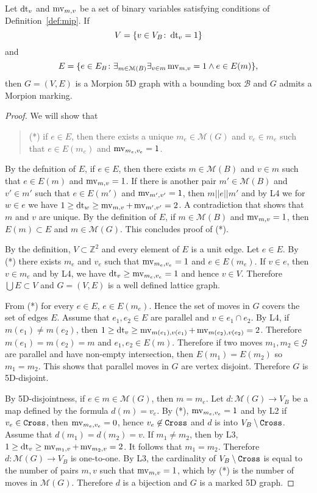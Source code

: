 \begin{lemma}
  Let $\operatorname{dt}_v$ and $\operatorname{mv}_{m, v}$ be a set of binary variables satisfying 
    conditions of Definition~\ref{def:mip}.
  If
 \[
    V = \{ v \in V_B \colon \operatorname{dt}_v = 1 \}
\]
 and
 \[
    E = \{ e \in E_B \colon \exists_{m \in \mathcal{M}(B)} \exists_{v \in m} \operatorname{mv}_{m, v} = 1 \wedge e  \in E(m) \},
  \]
then $G = (V, E)$ is a Morpion 5D graph with a bounding box $\mathcal{B}$ and $G$ admits a Morpion marking.
\end{lemma}
\begin{proof}
  We will show that
  \begin{quote}
  (*) if $e \in E$, then there exists a unique $m_e \in \mathcal{M}(G)$ and $v_e \in m_e$ such that $e \in E(m_e)$ and $\operatorname{mv}_{m_e, v_e} = 1$. 
  \end{quote}
  By the defnition of $E$, if $e \in E$, then there exists $m \in \mathcal{M}(B)$ and $v \in m$ such that
    $e \in E(m)$ and $\operatorname{mv}_{m, v} = 1$. If there is another pair $m' \in \mathcal{M}(B)$ and $v' \in m'$ such 
    that $e \in E(m')$ and $\operatorname{mv}_{m', v'} = 1$, then $m || e || m'$ and by L4 we for $w \in e$ we have
    $1 \geq \operatorname{dt}_w \geq \operatorname{mv}_{m, v} + \operatorname{mv}_{m', v'} = 2$. A contradiction that shows that $m$ and $v$ are unique.
  By the definition of $E$, if $m \in \mathcal{M}(B)$ and  $\operatorname{mv}_{m, v} = 1$, then $E(m) \subset E$ and
    $m \in \mathcal{M}(G)$.
  This concludes proof of (*).
  
  By the definition, $V \subset \mathbb{Z}^2$ and every element of $E$ is a unit edge.
  Let $e \in E$. By (*) there exists $m_e$ and $v_e$ such that $\operatorname{mv}_{m_e, v_e} = 1$ and $e \in E(m_e)$.
  If $v \in e$, then $v \in m_e$ and by L4, we have $\operatorname{dt}_v \geq \operatorname{mv}_{m_e, v_e} = 1$ and hence $v \in V$.
  Therefore $\bigcup E \subset V$ and $G = (V, E)$ is a well defined lattice graph.
  
  From (*) for every $e \in E$, $e \in E(m_e)$. Hence the set of moves in $G$ covers the set of edges $E$.
  Assume that $e_1, e_2 \in E$ are parallel and $v \in e_1 \cap e_2$.
  By L4, if $m(e_1) \neq m(e_2)$, then $1 \geq \operatorname{dt}_v \geq \operatorname{mv}_{m(e_1), v(e_1)} + \operatorname{mv}_{m(e_2), v(e_2)} = 2$.
  Therefore $m(e_1) = m(e_2) = m$ and $e_1, e_2 \in E(m)$.
   Therefore if two moves $m_1, m_2 \in \mathcal{G}$ are parallel and have non-empty intersection, then
     $E(m_1) = E(m_2)$ so $m_1 = m_2$.
   This shows that parallel moves in $G$ are vertex disjoint.
  Therefore $G$ is 5D-disjoint.
  
  By 5D-disjointness, if $e \in m \in \mathcal{M}(G)$, then $m = m_e$. Let $d \colon \mathcal{M}(G) \to V_B$ be a map defined by the formula $d(m) = v_e$. By (*), $\operatorname{mv}_{m_e, v_e} = 1$ and by L2 if $v_e \in \texttt{Cross}$, then $\operatorname{mv}_{m_e, v_e} = 0$, hence $v_e \not \in \texttt{Cross}$ and $d$ is into $V_B \setminus \texttt{Cross}$.
Assume that $d(m_1) = d(m_2) = v$. If $m_1 \neq m_2$, then by L3, $1 \geq \operatorname{dt}_v \geq \operatorname{mv}_{m_1, v} + \operatorname{mv}_{m_2, v} = 2$. It follows that $m_1 = m_2$. Therefore $d \colon \mathcal{M}(G) \to V_B$ is one-to-one.
  By L3, the cardinality of $V_B \setminus \texttt{Cross}$ is equal to the number of pairs $m, v$ such that $\operatorname{mv}_{m,v} = 1$, which by (*) is the number of moves in $\mathcal{M}(G)$.
  Therefore $d$ is a bijection and $G$ is a marked 5D graph. 
\end{proof}

